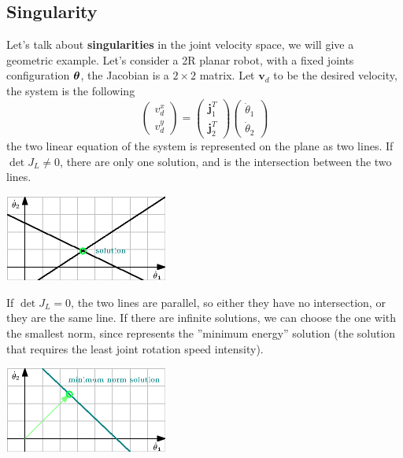 \documentclass[10pt, letterpaper]{report}
\begin{document}
\subsection{Singularity}
Let's talk about \textbf{singularities} in the joint velocity space, we will give a geometric example. Let's consider a 2R planar robot, with a fixed joints configuration ${\boldsymbol{\theta}}$, the Jacobian is a $2\times 2$ matrix. Let $\mathbf v_d$ to be the desired velocity, the system is the following\begin{equation}
    \begin{pmatrix}
        v_d^x\\v_d^y
    \end{pmatrix}=
    \begin{pmatrix}
       \mathbf j_1^T\\\mathbf j_2^T
    \end{pmatrix}
    \begin{pmatrix}
        \dot\theta_1\\\dot\theta_2
    \end{pmatrix}
\end{equation}
the two linear equation of the system is represented on the plane as two lines. If $\det J_L\ne 0$, there are only one solution, and is the intersection between the two lines.
\begin{center}
    \includegraphics[width=0.4\textwidth ]{images/system_one_sol.eps} 
\end{center}
If $\det J_L= 0$, the two lines are parallel, so either they have no intersection, or they are the same line. If there are infinite solutions, we can choose the one with the smallest norm, since represents the ''minimum energy'' solution (the solution that requires the least joint rotation speed intensity).
\begin{center}
    \includegraphics[width=0.4\textwidth ]{images/infinite_sol.eps} 
\end{center}
\end{document}
